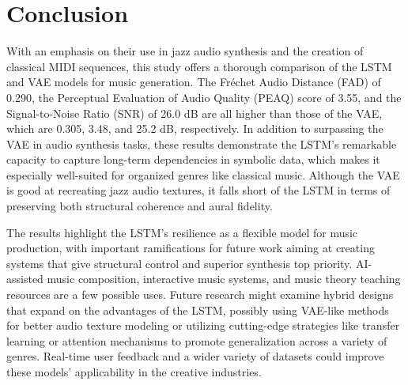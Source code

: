 \documentclass[conference]{IEEEtran}
\begin{document}
\section{Conclusion}
With an emphasis on their use in jazz audio synthesis and the creation of classical MIDI sequences, this study offers a thorough comparison of the LSTM and VAE models for music generation.  The Fréchet Audio Distance (FAD) of 0.290, the Perceptual Evaluation of Audio Quality (PEAQ) score of 3.55, and the Signal-to-Noise Ratio (SNR) of 26.0 dB are all higher than those of the VAE, which are 0.305, 3.48, and 25.2 dB, respectively. In addition to surpassing the VAE in audio synthesis tasks, these results demonstrate the LSTM's remarkable capacity to capture long-term dependencies in symbolic data, which makes it especially well-suited for organized genres like classical music.  Although the VAE is good at recreating jazz audio textures, it falls short of the LSTM in terms of preserving both structural coherence and aural fidelity.

The results highlight the LSTM's resilience as a flexible model for music production, with important ramifications for future work aiming at creating systems that give structural control and superior synthesis top priority.  AI-assisted music composition, interactive music systems, and music theory teaching resources are a few possible uses.  Future research might examine hybrid designs that expand on the advantages of the LSTM, possibly using VAE-like methods for better audio texture modeling or utilizing cutting-edge strategies like transfer learning or attention mechanisms to promote generalization across a variety of genres.  Real-time user feedback and a wider variety of datasets could improve these models' applicability in the creative industries.



\end{document}

